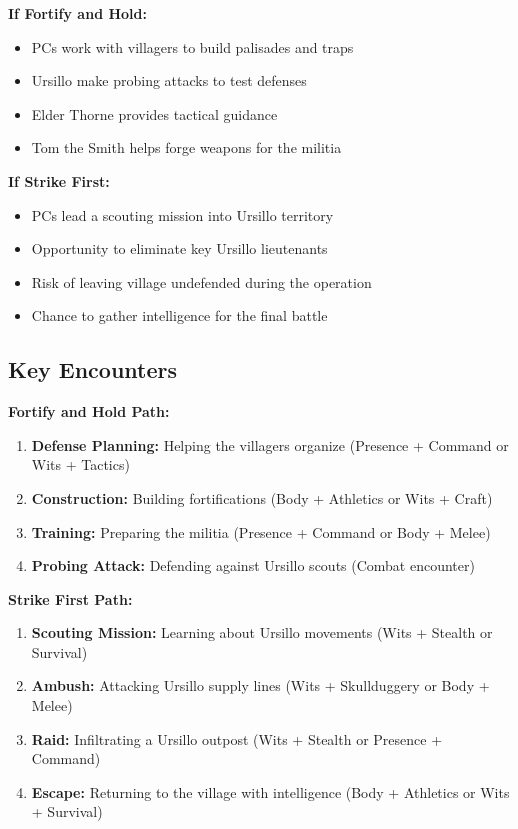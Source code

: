 \documentclass[11pt]{article}
\begin{document}
\textbf{If Fortify and Hold:}
\begin{itemize}
\item PCs work with villagers to build palisades and traps
\item Ursillo make probing attacks to test defenses
\item Elder Thorne provides tactical guidance
\item Tom the Smith helps forge weapons for the militia
\end{itemize}

\textbf{If Strike First:}
\begin{itemize}
\item PCs lead a scouting mission into Ursillo territory
\item Opportunity to eliminate key Ursillo lieutenants
\item Risk of leaving village undefended during the operation
\item Chance to gather intelligence for the final battle
\end{itemize}

\subsection{Key Encounters}

\textbf{Fortify and Hold Path:}
\begin{enumerate}
\item \textbf{Defense Planning:} Helping the villagers organize (Presence + Command or Wits + Tactics)
\item \textbf{Construction:} Building fortifications (Body + Athletics or Wits + Craft)
\item \textbf{Training:} Preparing the militia (Presence + Command or Body + Melee)
\item \textbf{Probing Attack:} Defending against Ursillo scouts (Combat encounter)
\end{enumerate}

\textbf{Strike First Path:}
\begin{enumerate}
\item \textbf{Scouting Mission:} Learning about Ursillo movements (Wits + Stealth or Survival)
\item \textbf{Ambush:} Attacking Ursillo supply lines (Wits + Skullduggery or Body + Melee)
\item \textbf{Raid:} Infiltrating a Ursillo outpost (Wits + Stealth or Presence + Command)
\item \textbf{Escape:} Returning to the village with intelligence (Body + Athletics or Wits + Survival)
\end{enumerate}
\end{document}

